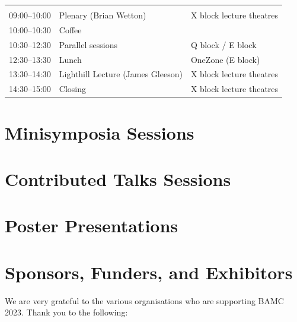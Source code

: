 \documentclass[12pt,a4paper]{article}
\begin{document}
\begin{tabularx}{\linewidth}{P{20mm}YP{50mm}}
  \\
  09:00--10:00 & Plenary (Brian Wetton) & X block lecture theatres\\
  10:00--10:30 & Coffee & \\
  10:30--12:30 & Parallel sessions & Q block / E block\\
  12:30--13:30 & Lunch & OneZone (E block)\\
  13:30--14:30 & Lighthill Lecture (James Gleeson) & X block lecture theatres\\
  14:30--15:00 & Closing & X block lecture theatres
\end{tabularx}

\section{Minisymposia Sessions}



\section{Contributed Talks Sessions}



\section{Poster Presentations}

{\footnotesize\raggedright}

\section{Sponsors, Funders, and Exhibitors}

We are very grateful to the various organisations who are supporting BAMC 2023. Thank you to the following:\bigskip
\end{document}
